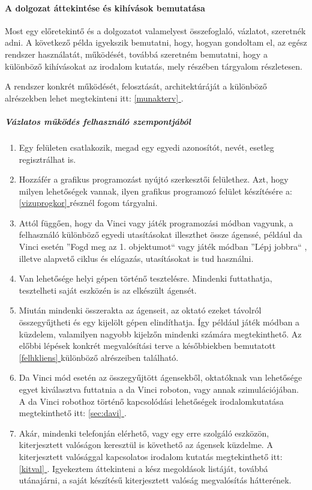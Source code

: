 \documentclass[12pt,a4paper,oneside]{report} %
\newcommand*{\fullref}[1]{\hyperref[{#1}]{\ref*{#1} \nameref*{#1}}} %
\begin{document}
\newpage
\paragraph{A dolgozat áttekintése és kihívások bemutatása}
Most egy előretekintő és a dolgozatot valamelyest összefoglaló, vázlatot, szeretnék adni. A következő példa igyekszik bemutatni, hogy, hogyan gondoltam el, az egész rendszer használatát, működését, továbbá szeretném bemutatni, hogy a különböző kihívásokat az irodalom kutatás, mely részében tárgyalom részletesen.
\par A rendszer konkrét működését, felosztását, architektúráját a különböző alrészekben lehet megtekinteni itt: \fullref{munakterv}.

\subparagraph{Vázlatos működés felhasználó szempontjából}
\begin{enumerate}
	\item Egy felületen csatlakozik, megad egy egyedi azonosítót, nevét, esetleg regisztrálhat is.
	\item Hozzáfér a grafikus programozást nyújtó szerkesztői felülethez. Azt, hogy milyen lehetőségek vannak, ilyen grafikus programozó felület készítésére a: \fullref{vizuprogkor} résznél fogom tárgyalni.
	\item Attól függően, hogy da Vinci vagy játék programozási módban vagyunk, a felhasználó különböző egyedi utasításokat illeszthet össze ágenssé, például da Vinci esetén ''Fogd meg az 1. objektumot`` vagy játék módban ''Lépj jobbra`` , illetve alapvető ciklus és elágazás, utasításokat is tud használni.
	\item Van lehetősége helyi gépen történő tesztelésre. Mindenki futtathatja, tesztelheti saját eszközén is az elkészült ágensét.
	\item Miután mindenki összerakta az ágenseit, az oktató ezeket távolról összegyűjtheti és egy kijelölt gépen elindíthatja. Így például játék módban a küzdelem, valamilyen nagyobb kijelzőn  mindenki számára  megtekinthető.  Az előbbi lépések konkrét megvalósítási terve a későbbiekben bemutatott \fullref{felhkliens} különböző alrészeiben található.
	\item Da Vinci mód esetén az összegyűjtött ágensekből, oktatóknak van lehetősége egyet kiválasztva futtatnia a da Vinci roboton, vagy annak szimulációjában. A da Vinci robothoz történő kapcsolódási lehetőségek irodalomkutatása megtekinthető itt: \fullref{sec:davi}.
	\item Akár, mindenki telefonján elérhető, vagy egy erre szolgáló  eszközön, kiterjesztett valóságon keresztül is követhető az ágensek  küzdelme. A kiterjesztett valósággal kapcsolatos irodalom kutatás megtekinthető itt: \fullref{kitval}. Igyekeztem áttekinteni a kész megoldások listáját, továbbá utánajárni, a saját készítésű kiterjesztett valóság megvalósítás hátterének.
\end{enumerate}
 
\end{document}
